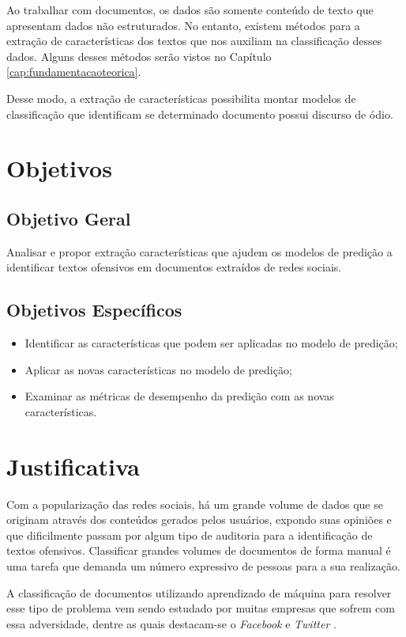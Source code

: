 Ao trabalhar com documentos, os dados são somente conteúdo de texto que apresentam dados não estruturados. No entanto, existem métodos para a extração de características dos textos que nos auxiliam na classificação desses dados. Alguns desses métodos serão vistos no Capítulo \ref{cap:fundamentacaoteorica}.
 
Desse modo, a extração de características possibilita montar modelos de classificação que identificam se determinado documento possui discurso de ódio.

\section{Objetivos}
\subsection{Objetivo Geral}
Analisar e propor extração características que ajudem os modelos  de predição a identificar textos ofensivos em documentos extraídos de redes sociais.

\subsection{Objetivos Específicos}
\begin{itemize}
    \setlength\itemsep{1.2em}
    \item Identificar as características que podem ser aplicadas no modelo de predição;
    \item Aplicar as novas características no modelo de predição;
    \item Examinar as métricas de desempenho da predição com as novas características.
\end{itemize}

\section{Justificativa}
Com a popularização das redes sociais, há um grande volume de dados que se originam através dos conteúdos gerados pelos usuários, expondo suas opiniões e que dificilmente passam por algum tipo de auditoria para a identificação de textos ofensivos. Classificar grandes volumes de documentos de forma manual é uma tarefa que demanda um número expressivo de pessoas para a sua realização.

A classificação de documentos utilizando aprendizado de máquina para resolver esse tipo de problema vem sendo estudado por muitas empresas que sofrem com essa adversidade, dentre as quais destacam-se o \textit{Facebook} e \textit{Twitter} \cite{nobata2016abusive}.

